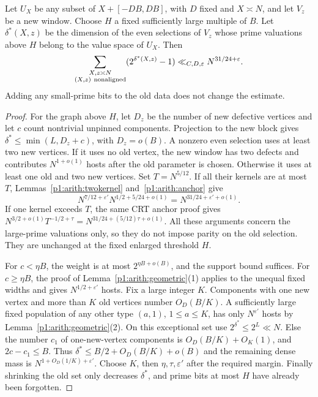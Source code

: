 \begin{lemma}\label{p1:arith:asymmetric}
Let $U_X$ be any subset of $X+[-DB,DB]$, with $D$ fixed and $X\asymp N$,
and let $V_z$ be a new window.  Choose $H$ a fixed sufficiently large
multiple of $B$.  Let $\delta^*(X,z)$ be the dimension of the even selections
of $V_z$ whose prime valuations above $H$ belong to the value space of
$U_X$.  Then
\[
 \sum_{\substack{X,z\asymp N\\(X,z)\ {\rm nonaligned}}}
       (2^{\delta^*(X,z)}-1)
 \ll_{C,D,\varepsilon}N^{31/24+\varepsilon}.
\]
Adding any small-prime bits to the old data does not change the estimate.
\end{lemma}

\begin{proof}
For the graph above $H$, let $D_z$ be the number of new defective vertices
and let $c$ count nontrivial unpinned components.  Projection to the new
block gives $\delta^*\leq\min(L,D_z+c)$, with $D_z=o(B)$.
A nonzero even selection uses at least two new vertices.  If it uses no
old vertex, the new window has two defects and contributes $N^{1+o(1)}$
hosts after the old parameter is chosen.  Otherwise it uses at least one
old and two new vertices.  Set $T=N^{5/12}$.
If all their kernels are at most $T$, Lemmas~\ref{p1:arith:twokernel}
and~\ref{p1:arith:anchor} give
\[
 N^{7/12+\varepsilon'}N^{1/2+5/24+o(1)}=N^{31/24+\varepsilon'+o(1)}.
\]
If one kernel exceeds $T$, the same CRT anchor proof gives
$N^{3/2+o(1)}T^{-1/2+\tau}=N^{31/24+(5/12)\tau+o(1)}$.
All these arguments concern the large-prime valuations only, so they do
not impose parity on the old selection.  They are unchanged at the
fixed enlarged threshold $H$.

For $c<\eta B$, the weight is at most $2^{\eta B+o(B)}$, and the support
bound suffices.  For $c\geq\eta B$, the proof of
Lemma~\ref{p1:arith:geometric}(1) applies to the unequal fixed widths and
gives $N^{1/2+\varepsilon'}$ hosts.  Fix a large integer $K$.  Components
with one new vertex and more than $K$ old vertices number $O_D(B/K)$.
A sufficiently large fixed population of any other type $(a,1)$,
$1\leq a\leq K$, has only $N^{\varepsilon'}$ hosts by
Lemma~\ref{p1:arith:geometric}(2).  On this exceptional set use
$2^{\delta^*}\leq2^L\ll N$.  Else the number $c_1$ of one-new-vertex
components is $O_D(B/K)+O_K(1)$, and $2c-c_1\leq B$.  Thus
$\delta^*\leq B/2+O_D(B/K)+o(B)$ and the remaining dense mass is
$N^{1+O_D(1/K)+\varepsilon'}$.
Choose $K$, then $\eta,\tau,\varepsilon'$ after the required margin.
Finally shrinking the old set only decreases $\delta^*$, and prime bits
at most $H$ have already been forgotten.
\end{proof}

